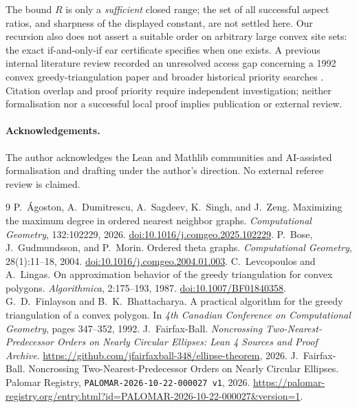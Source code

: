 \documentclass[11pt,a4paper]{article}
\theoremstyle{definition}\newtheorem{definition}[theorem]{Definition}
\theoremstyle{remark}\newtheorem{remark}[theorem]{Remark}
\newcommand{\Rbound}{R}
\begin{document}
The bound $\Rbound$ is only a \emph{sufficient} closed range; the set of all successful aspect ratios, and sharpness of the displayed constant, are not settled here. Our recursion also does not assert a suitable order on arbitrary large convex site sets: the exact if-and-only-if ear certificate specifies when one exists. A previous internal literature review recorded an unresolved access gap concerning a 1992 convex greedy-triangulation paper and broader historical priority searches \citep{finlayson1992}. Citation overlap and proof priority require independent investigation; neither formalisation nor a successful local proof implies publication or external review.

\paragraph{Acknowledgements.} The author acknowledges the Lean and Mathlib communities and AI-assisted formalisation and drafting under the author's direction. No external referee review is claimed.

\begin{thebibliography}{9}
P.~\'{A}goston, A.~Dumitrescu, A.~Sagdeev, K.~Singh, and J.~Zeng.
\newblock Maximizing the maximum degree in ordered nearest neighbor graphs.
\newblock \emph{Computational Geometry}, 132:102229, 2026.
\newblock \href{https://doi.org/10.1016/j.comgeo.2025.102229}{doi:10.1016/j.comgeo.2025.102229}.
P.~Bose, J.~Gudmundsson, and P.~Morin.
\newblock Ordered theta graphs.
\newblock \emph{Computational Geometry}, 28(1):11--18, 2004.
\newblock \href{https://doi.org/10.1016/j.comgeo.2004.01.003}{doi:10.1016/j.comgeo.2004.01.003}.
C.~Levcopoulos and A.~Lingas.
\newblock On approximation behavior of the greedy triangulation for convex polygons.
\newblock \emph{Algorithmica}, 2:175--193, 1987.
\newblock \href{https://doi.org/10.1007/BF01840358}{doi:10.1007/BF01840358}.
G.~D.~Finlayson and B.~K.~Bhattacharya.
\newblock A practical algorithm for the greedy triangulation of a convex polygon.
\newblock In \emph{4th Canadian Conference on Computational Geometry}, pages 347--352, 1992.
J.~Fairfax-Ball.
\newblock \emph{Noncrossing Two-Nearest-Predecessor Orders on Nearly Circular Ellipses:
Lean 4 Sources and Proof Archive}.
\newblock \url{https://github.com/jfairfaxball-348/ellipse-theorem}, 2026.
J.~Fairfax-Ball.
\newblock Noncrossing Two-Nearest-Predecessor Orders on Nearly Circular Ellipses.
\newblock Palomar Registry, \texttt{PALOMAR-2026-10-22-000027 v1}, 2026.
\newblock \url{https://palomar-registry.org/entry.html?id=PALOMAR-2026-10-22-000027&version=1}.
\end{thebibliography}
\end{document}
